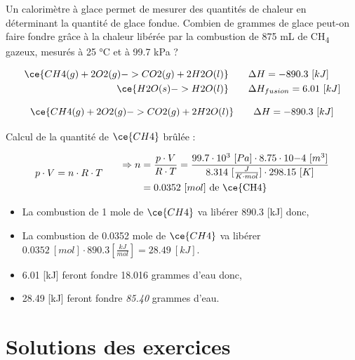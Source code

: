 \documentclass[
  11pt,
  french,
  a4paper,
  openany]{book}
\begin{document}
\begin{Exercise}

Un calorimètre à glace permet de mesurer des quantités de chaleur en déterminant la quantité de glace fondue. Combien de grammes de glace peut-on faire fondre grâce à la chaleur libérée par la combustion de 875 mL de CH\textsubscript{4} gazeux, mesurés à 25 °C et à 99.7 kPa ?

\[
\begin{split}
\ce{CH4(g) + 2 O2(g) -> CO2(g) + 2 H2O(l)} \qquad & \Delta H = - 890.3\ [kJ] \\
\ce{H2O(s) -> H2O(l)} \qquad & \Delta H_{fusion} = 6.01\ [kJ]
\end{split}
\]



\end{Exercise}

\begin{Answer}

\[
\ce{CH4(g) + 2 O2(g) -> CO2(g) + 2 H2O(l)} \qquad \Delta H = - 890.3\ [kJ]
\]

Calcul de la quantité de \(\ce{CH4}\) brûlée :

\[
\begin{split}
p \cdot V = n \cdot R \cdot T
\end{split}
\qquad
\begin{split}
\Rightarrow n &= \frac{p \cdot V}{R \cdot T} = \frac{99.7 \cdot 10^{3}\ [Pa] \cdot 8.75 \cdot 10{-4}\ [m^3]}{8.314\ [\frac{J}{K \cdot mol}] \cdot 298.15\ [K]} \\
 &= 0.0352\ [mol] \text{ de \ce{CH4}}
\end{split}
\]

\begin{itemize}
\item
  La combustion de 1 mole de \(\ce{CH4}\) va libérer 890.3 {[}kJ{]} donc,
\item
  La combustion de 0.0352 mole de \(\ce{CH4}\) va libérer \(0.0352\ [mol] \cdot 890.3 [\frac{kJ}{mol}] = 28.49\ [kJ]\).
\item
  6.01 {[}kJ{]} feront fondre 18.016 grammes d'eau donc,
\item
  28.49 {[}kJ{]} feront fondre \emph{85.40} grammes d'eau.
\end{itemize}


\end{Answer}

\clearpage

\section{Solutions des exercices} \shipoutAnswer
\end{document}
